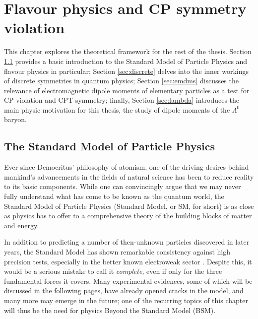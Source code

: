 \chapter{Flavour physics and CP symmetry violation}
This chapter explores the theoretical framework for the rest of the thesis.
Section \ref{sec:sm} provides a basic introduction to the Standard Model of Particle Physics and flavour physics in particular;
Section \ref{sec:discrete} delves into the inner workings of discrete symmetries in quantum physics;
Section \ref{sec:emdms} discusses the relevance of electromagnetic dipole moments of elementary particles as a test for CP violation and CPT symmetry;
finally, Section \ref{sec:lambda} introduces the main physic motivation for this thesis, the study of dipole moments of the $\Lambda^0$ baryon.

\section{The Standard Model of Particle Physics}
\label{sec:sm}
Ever since Democritus' philosophy of atomism, one of the driving desires behind mankind's advancements in the fields of natural science has been to reduce reality to its basic components.
While one can convincingly argue that we may never fully understand what has come to be known as the quantum world, the Standard Model of Particle Physics (Standard Model, or SM, for short) \cite{aitchinson_hey} is as close as physics has to offer to a comprehensive theory of the building blocks of matter and energy.

In addition to predicting a number of then-unknown particles discovered in later years, the Standard Model has shown remarkable consistency against high precision tests, especially in the better known electroweak sector \cite{Erler_2019}.
Despite this, it would be a serious mistake to call it \textit{complete}, even if only for the three fundamental forces it covers.
Many experimental evidences, some of which will be discussed in the following pages, have already opened cracks in the model, and many more may emerge in the future;
one of the recurring topics of this chapter will thus be the need for physics Beyond the Standard Model (BSM).

